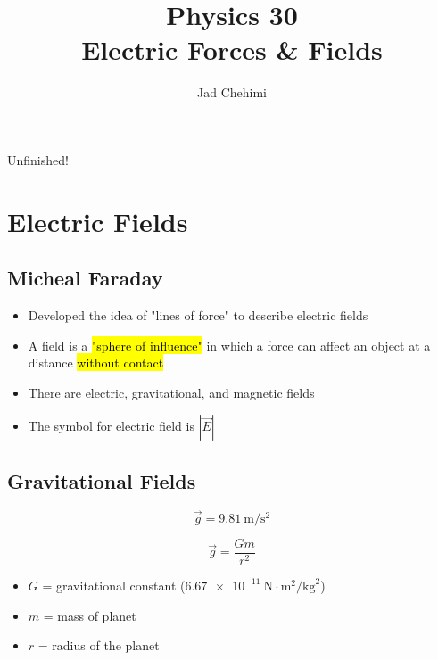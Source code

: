 \documentclass[a4paper,12pt]{article}
\title{Physics 30 \\ Electric Forces \& Fields}
\author{Jad Chehimi}
\begin{document}
\maketitle

\begin{center}
\Huge
Unfinished!
\normalsize
\end{center}

\tableofcontents

\pagebreak

\section{Electric Fields}
\subsection{Micheal Faraday}
\begin{itemize}
    \item{Developed the idea of "lines of force" to describe electric fields}
    \item{A field is a \hl{"sphere of influence"} in which a force can affect an object at a distance \hl{without contact}}
    \item{There are electric, gravitational, and magnetic fields}
    \item{The symbol for electric field is $|\vec{E}|$}
\end{itemize}

\subsection{Gravitational Fields}
\Large $$\vec{g} = \SI{9.81}{\m\per\s\squared}$$ \normalsize

\Large $$\vec{g} = \frac{Gm}{r^2}$$ \normalsize
\begin{itemize}
    \item{$G$ = gravitational constant ($\SI{6.67e-11}{\N\cdot\m\squared\per\kg\squared}$)}
    \item{$m$ = mass of planet}
    \item{$r$ = radius of the planet}
\end{itemize}

\pagebreak
\end{document}
